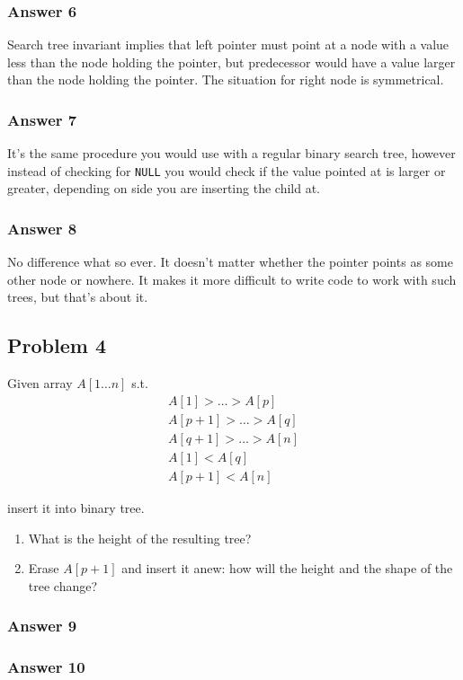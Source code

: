 \documentclass[11pt]{article}
\begin{document}
\subsubsection{Answer 6}
\label{sec-1-3-1}
Search tree invariant implies that left pointer must point at a node with
a value less than the node holding the pointer, but predecessor would have
a value larger than the node holding the pointer.  The situation for right
node is symmetrical.

\subsubsection{Answer 7}
\label{sec-1-3-2}
It's the same procedure you would use with a regular binary search tree,
however instead of checking for \texttt{NULL} you would check if the value pointed
at is larger or greater, depending on side you are inserting the child at.

\subsubsection{Answer 8}
\label{sec-1-3-3}
No difference what so ever.  It doesn't matter whether the pointer points
as some other node or nowhere.  It makes it more difficult to write code
to work with such trees, but that's about it.

\subsection{Problem 4}
\label{sec-1-4}
Given array $A[1\dots n]$ s.t. 
\begin{align*}
  A[1] > \dots > A[p] \\
  A[p + 1] > \dots > A[q] \\
  A[q + 1] > \dots > A[n] \\
  A[1] < A[q] \\
  A[p + 1] < A[n]
\end{align*}

insert it into binary tree.
\begin{enumerate}
\item What is the height of the resulting tree?
\item Erase $A[p+1]$ and insert it anew: how will the height and the shape of
the tree change?
\end{enumerate}

\subsubsection{Answer 9}
\label{sec-1-4-1}

\subsubsection{Answer 10}
\label{sec-1-4-2}
\end{document}
